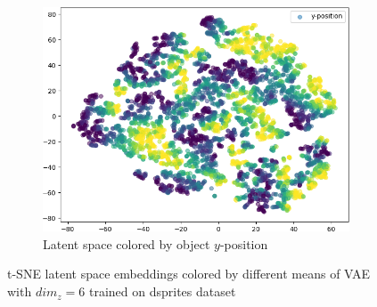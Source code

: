 \begin{figure}
\begin{subfigure}{.19\textwidth}
    \end{subfigure}
    \hfill
    \begin{subfigure}{.19\textwidth}
        \includegraphics[width=\textwidth]{images/latent_spaces/dsprites/vae/embeddings_mu_4.png}
        \caption{Latent space colored by object $y$-position}
    \end{subfigure}
    \caption[\ac{VAE} Latent Space on dsprites]{t-SNE latent space embeddings colored by different means of \ac{VAE} with $dim_z=6$ trained on dsprites dataset}
    \label{fig:vae_latent_space_dsprites}
\end{figure}

